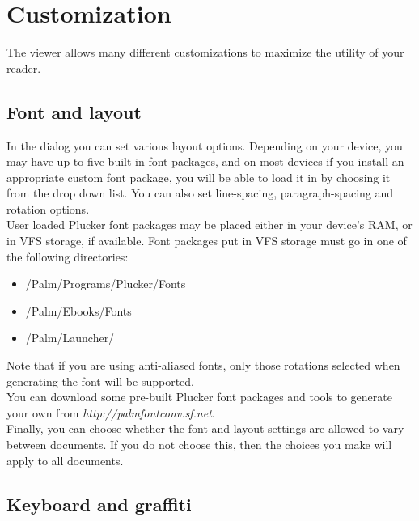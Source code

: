 \section{Customization}\label{sec:Config}

The viewer allows many different customizations to maximize the utility
of your reader.

\subsection{Font and layout}\label{sec:Font}

In the  dialog you can set various layout options.
Depending on your device, you may have up to five built-in font packages, and
on most devices if you install an appropriate custom font package, you will be
able to load it in by choosing it from the  drop down
list.  You can also set line-spacing, paragraph-spacing and rotation options.\\

User loaded Plucker font packages may be placed either in your device's RAM, or
in VFS storage, if available.  Font packages put in VFS storage must go in one
of the following directories:\\

\begin{itemize}
  \item /Palm/Programs/Plucker/Fonts
  \item /Palm/Ebooks/Fonts
  \item /Palm/Launcher/
\end{itemize}

Note that if you are using anti-aliased fonts, only those rotations selected
when generating the font will be supported.\\

You can download some pre-built Plucker font packages and tools to generate
your own from
\textit{
{http://palmfontconv.sf.net}}.\\

Finally, you can choose whether the font and layout settings are allowed to
vary between documents.  If you do not choose this, then the choices you make
will apply to all documents.

\subsection{Keyboard and graffiti}\label{sec:Keyboard}

